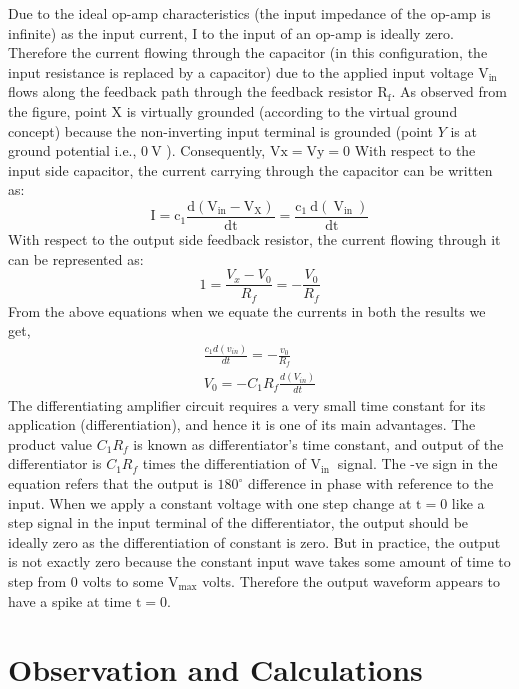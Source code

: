 Due to the ideal op-amp characteristics (the input impedance of the op-amp is infinite) as the input current, I to the input of an op-amp is ideally zero. Therefore the current flowing through the capacitor (in this configuration, the input resistance is replaced by a capacitor) due to the applied input voltage $\mathrm{V}_{\text {in }}$ flows along the feedback path through the feedback resistor $\mathrm{R}_{\mathrm{f}}$.
As observed from the figure, point $\mathrm{X}$ is virtually grounded (according to the virtual ground concept) because the non-inverting input terminal is grounded (point $Y$ is at ground potential i.e., $0 \mathrm{~V}$ ).
Consequently, $\mathrm{Vx}=\mathrm{Vy}=0$
With respect to the input side capacitor, the current carrying through the capacitor can be written as:
$$
\mathrm{I}=\mathrm{c}_{1} \frac{\mathrm{d}\left(\mathrm{V}_{\mathrm{in}}-\mathrm{V}_{\mathrm{X}}\right)}{\mathrm{dt}}=\frac{\mathrm{c}_{1} \mathrm{~d}\left(\mathrm{~V}_{\text {in }}\right)}{\mathrm{dt}}
$$
With respect to the output side feedback resistor, the current flowing through it can be represented as:
$$
1=\frac{V_{x}-V_{0}}{R_{f}}=-\frac{V_{0}}{R_{f}}
$$
From the above equations when we equate the currents in both the results we get,
$$
\begin{gathered}
\frac{c_{1} d\left(v_{i n}\right)}{d t}=-\frac{v_{0}}{R_{f}} \\
V_{0}=-C_{1} R_{f} \frac{d\left(V_{i n}\right)}{d t}
\end{gathered}
$$
The differentiating amplifier circuit requires a very small time constant for its application (differentiation), and hence it is one of its main advantages.
The product value $C_{1} R_{f}$ is known as differentiator's time constant, and output of the differentiator is $C_{1} R_{f}$ times the differentiation of $\mathrm{V}_{\text {in }}$ signal. The -ve sign in the equation refers that the output is $180^{\circ}$ difference in phase with reference to the input.
When we apply a constant voltage with one step change at $\mathrm{t}=0$ like a step signal in the input terminal of the differentiator, the output should be ideally zero as the differentiation of constant is zero. But in practice, the output is not exactly zero because the constant input wave takes some amount of time to step from 0 volts to some $\mathrm{V}_{\max }$ volts. Therefore the output waveform appears to have a spike at time $\mathrm{t}=0 .$






\section{Observation and Calculations}


